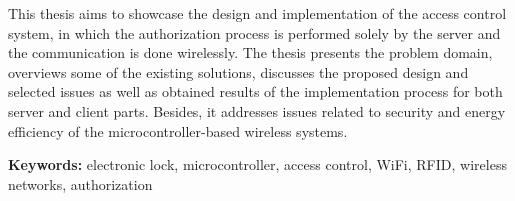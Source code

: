	This thesis aims to showcase the design and implementation of the access control system, in which the authorization process is performed solely by the server and the communication is done wirelessly. The thesis presents the problem domain, overviews some of the existing solutions, discusses the proposed design and selected issues as well as obtained results of the implementation process for both server and client parts. Besides, it addresses issues related to security and energy efficiency of the microcontroller-based wireless systems.

	\textbf{Keywords:} electronic lock, microcontroller, access control, WiFi, RFID, wireless networks, authorization